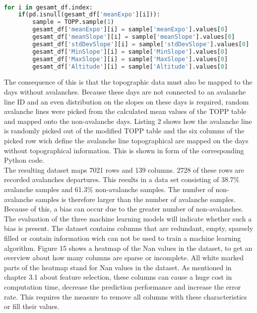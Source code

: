 \documentclass[../masterarbeit.tex]{subfiles}
\begin{document}
\\
\begin{lstlisting}[language=Python, caption=mapping random sample lines of topographical data onto the rows of non avalanche days]
for i in gesamt_df.index:
    if(pd.isnull(gesamt_df['meanExpo'][i])):
        sample = TOPP.sample(1)
        gesamt_df['meanExpo'][i] = sample['meanExpo'].values[0]
        gesamt_df['meanSlope'][i] = sample['meanSlope'].values[0]
        gesamt_df['stdDevSlope'][i] = sample['stdDevSlope'].values[0]
        gesamt_df['MinSlope'][i] = sample['MinSlope'].values[0]
        gesamt_df['MaxSlope'][i] = sample['MaxSlope'].values[0]
        gesamt_df['Altitude'][i] = sample['Altitude'].values[0]
\end{lstlisting} 
The consequence of this is that the topographic data must also be mapped to the days without avalanches. Because these days are not connected to an avalanche line ID and an even distribution on the slopes on these days is required, random avalanche lines were picked from the calculated mean values of the TOPP table and mapped onto the non-avalanche days. Listing 2 shows how the avalanche line is randomly picked out of the modified TOPP table and the six columns of the picked row wich define the avalanche line topographical are mapped on the days without topographical information. This is shown in form of the corresponding Python code.\\ 
The resulting dataset maps 7021 rows and 139 columns. 2728 of these rows are recorded avalanches departures. This results in a data set consisting of 38.7\% avalanche samples and 61.3\% non-avalanche samples. The number of non-avalanche samples is therefore larger than the number of avalanche samples. Because of this, a bias can occur due to the greater number of non-avalanches. The evaluation of the three machine learning models will indicate whether such a bias is present. The dataset contains columns that are redundant, empty, sparsely filled or contain information wich can not be used to train a machine learning algorithm. Figure 15 shows a heatmap of the Nan values in the dataset, to get an overview about how many columns are sparse or incomplete. All white marked parts of the heatmap stand for Nan values in the dataset.  As mentioned in chapter 3.1 about feature selection, these columns can cause a huge cost in computation time, decrease the prediction performance and increase the error rate. This requires the measure to remove all columns with these characteristics or fill their values.
\\
\end{document}

